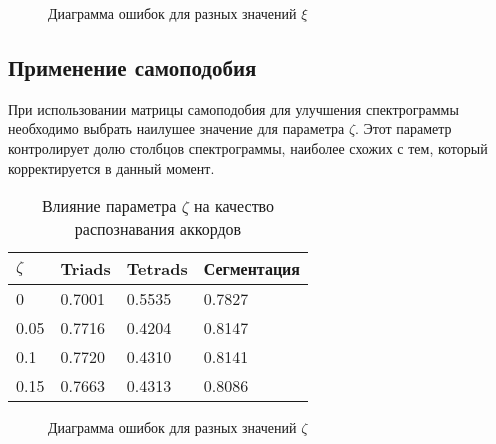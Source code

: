 \begin{figure}[h]
  \begin{minipage}[h]{0.49\linewidth}
  \end{minipage}
  \hfill
  \begin{minipage}[h]{0.49\linewidth}
  \end{minipage}
  \hfill
  \begin{minipage}[h]{0.49\linewidth}
  \end{minipage}
  \hfill
  \begin{minipage}[h]{0.49\linewidth}
  \end{minipage}
  \caption{Диаграмма ошибок для разных значений $\xi$}
  \label{img:xi}
\end{figure}

\subsection{Применение самоподобия} \label{ssect3_selfsim}

При использовании матрицы самоподобия для улучшения спектрограммы необходимо
выбрать наилушее значение для параметра $\zeta$. Этот параметр контролирует
долю столбцов спектрограммы, наиболее схожих с тем, который корректируется в
данный момент.

\begin{table} [htbp]
  \centering
  \parbox{15cm}{\caption{Влияние параметра $\zeta$ на качество распознавания
  аккордов} \label{Tzeta}}
  \begin{tabular}{|l|l|l|l|}
  \hline
  $\zeta$ & Triads & Tetrads & Сегментация \\
  \hline
  0 & 0.7001 & 0.5535 & 0.7827 \\
  0.05 & 0.7716 & 0.4204 & 0.8147 \\
  0.1 & 0.7720 & 0.4310 & 0.8141 \\
  0.15 & 0.7663 & 0.4313 & 0.8086 \\
  \hline
  \end{tabular}
\end{table}

\begin{figure}[h]
  \begin{minipage}[h]{0.49\linewidth}
  \end{minipage}
  \hfill
  \begin{minipage}[h]{0.49\linewidth}
  \end{minipage}
  \caption{Диаграмма ошибок для разных значений $\zeta$}
  \label{img:zeta}
\end{figure}

